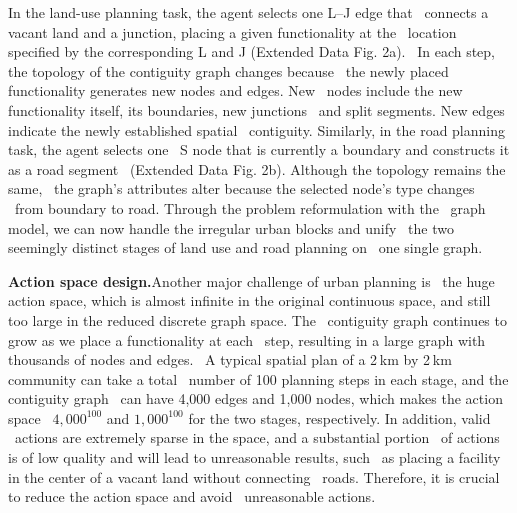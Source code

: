 In the land-use planning task, the agent selects one L–J edge that \
connects a vacant land and a junction, placing a given functionality at the \
location specified by the corresponding L and J (Extended Data Fig. 2a). \
In each step, the topology of the contiguity graph changes because \
the newly placed functionality generates new nodes and edges. New \
nodes include the new functionality itself, its boundaries, new junctions \
and split segments. New edges indicate the newly established spatial \
contiguity. Similarly, in the road planning task, the agent selects one \
S node that is currently a boundary and constructs it as a road segment \
(Extended Data Fig. 2b). Although the topology remains the same, \
the graph’s attributes alter because the selected node’s type changes \
from boundary to road. Through the problem reformulation with the \
graph model, we can now handle the irregular urban blocks and unify \
the two seemingly distinct stages of land use and road planning on \
one single graph.

\textbf{Action space design.}Another major challenge of urban planning is \
the huge action space, which is almost infinite in the original continuous space, and still too large in the reduced discrete graph space. The \
contiguity graph continues to grow as we place a functionality at each \
step, resulting in a large graph with thousands of nodes and edges. \
A typical spatial plan of a 2 km by 2 km community can take a total \
number of 100 planning steps in each stage, and the contiguity graph \
can have 4,000 edges and 1,000 nodes, which makes the action space \
$4,000^{100}$ and $1,000^{100}$ for the two stages, respectively. In addition, valid \
actions are extremely sparse in the space, and a substantial portion \
of actions is of low quality and will lead to unreasonable results, such \
as placing a facility in the center of a vacant land without connecting \
roads. Therefore, it is crucial to reduce the action space and avoid \
unreasonable actions.

